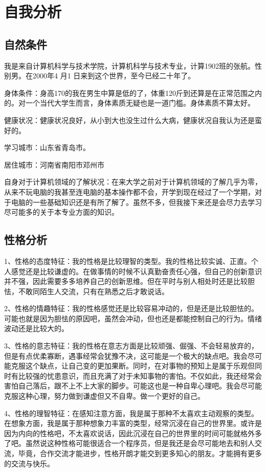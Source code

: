 \documentclass{article}
\begin{document}
\thispagestyle{empty}
\newpage
\setcounter{page}{1}
\section{自我分析}
	\par
\subsection{自然条件}
我是来自计算机科学与技术学院，计算机科学与技术专业，计算1902班的张航。性别男。在2000年4 月1 日来到这个世界，至今已经二十年了。\par 
身体条件：身高170的我在男生中算是低的了，体重120斤到还算是在正常范围之内的。对一个当代大学生而言，身体素质无疑也是一道门槛。身体素质不算太好。\par 
健康状况：健康状况良好，从小到大也没生过什么大病，健康状况自我认为还是蛮好的。\par 
学习城市：山东省青岛市。\par 
居住城市：河南省南阳市邓州市\par 
自身对于计算机领域的了解状况：在来大学之前对于计算机领域的了解几乎为零，从来不玩电脑的我甚至连电脑的基本操作都不会，开学到现在经过了一个学期，对于电脑的一些基础知识还是有所了解了。虽然不多，但我接下来还是会尽力去学习尽可能多的关于本专业方面的知识。\par
\subsection{性格分析}
1、性格的态度特征：我的性格是比较理智的类型。我的性格比较实诚、正直。个人感觉还是比较谦虚的。在做事情的时候不认真勤奋责任心强，但自己的创新意识并不强，因此需要多多培养自己的创新思维。但在平时与别人相处时还是比较胆怯，不敢同陌生人交流，只有在熟悉之后才敢说话。\par
2、性格的情趣特征：我的性格感觉还是比较容易冲动的，但是还是比较胆怯的。可能也就是因为胆怯的原因吧，虽然会冲动，但也还是都能控制自己的行为。情绪波动还是比较大的。\par
3、性格的意志特征：我的性格在意志方面是比较顽强、倔强、不会轻易放弃的，但是有点优柔寡断，遇事经常会犹豫不决，这可能是一个极大的缺点吧。我会尽可能克服这个缺点，让自己变的更加果断。同时，在对事物的预知上是属于乐观但同时有比较强的忧患意识，而且充满了对于未知事物的害怕。不仅如此，我还经常会害怕自己落后，跟不上不上大家的脚步。可能这也是一种自卑心理吧。我会尽可能克服这种心理，努力做到谦虚但又不自卑。做一个更好的自己。\par
4、性格的理智特征：在感知注意方面，我是属于那种不太喜欢主动观察的类型。在想象方面，我是属于那种想象力丰富的类型，经常沉浸在自己的世界里。或许是因为内向的性格吧，不太喜欢说话，因此沉浸在自己的世界里的时间可能就格外多了吧。虽然说这种性格可能很适合一个程序员，但是我还是会尽可能地去和别人交流，毕竟，合作交流才能进步，性格开朗才能交到更多知心的朋友。才能拥有更多的交流与快乐。\par
\end{document}
